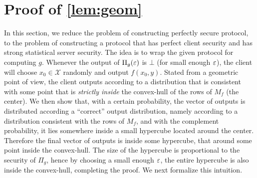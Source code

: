 \documentclass{llncs}
\newcommand{\bnote}[1]{\authnote{Bar}{#1}}
\newcommand{\X}{\mathcal{X}}
\begin{document}

\section{Proof of \texorpdfstring{\cref{lem:geom}}{Lemma 2}}\label{sec:geom}
In this section, we reduce the problem of constructing perfectly secure protocol, to the problem of constructing a protocol that has perfect client security and has strong statistical server security. The idea is to wrap the given protocol for computing $g$. Whenever the output of $\Pi_g(\varepsilon)$ is $\bot$ (for small enough $\varepsilon$), the client will choose $x_0\in\X$ randomly and output $f(x_0,y)$. Stated from a geometric point of view, the client outputs according to a distribution that is consistent with some point that is \emph{strictly inside} the convex-hull of the rows of $M_f$ (\eg the center).
\ifdefined\IsFV
We then show that, with a certain probability, the vector of outputs is distributed according a ``correct'' output distribution, namely according to a distribution consistent with the rows of $M_f$, and with the complement probability, it lies somewhere inside a small hypercube located around the center. Therefore the final vector of outputs is inside some hypercube, that around some point inside the convex-hull. The size of the hypercube is proportional to the security of $\Pi_g$, hence by choosing a small enough $\varepsilon$, the entire hypercube is also inside the convex-hull, completing the proof. We next formalize this intuition.
\else\fi
\end{document}
